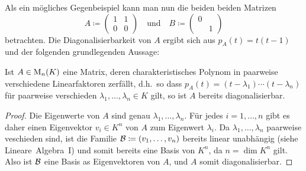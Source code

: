 Als ein mögliches Gegenbeispiel kann man nun die beiden beiden Matrizen
\[
            A
  \coloneqq \begin{pmatrix}
              1 & 1
              \\
              0 & 0
            \end{pmatrix}
  \quad\text{und}\quad
            B
  \coloneqq \begin{pmatrix}
              0 & 
              \\
                & 1
            \end{pmatrix}
\]
betrachten.
Die Diagonalisierbarkeit von $A$ ergibt sich aus $p_A(t) = t(t-1)$ und der folgenden grundlegenden Aussage:

\begin{lemma}
  \label{lemma: matrices with pairwise different eigenvalues are diagonalizable}
  Ist $A \in \operatorname{M}_{n}(K)$ eine Matrix, deren charakteristisches Polynom in paarweise verschiedene Linearfaktoren zerfällt, d.h.\ so dass $p_A(t) = (t - \lambda_1) \dotsm (t - \lambda_n)$ für paarweise verschieden $\lambda_1, \dotsc, \lambda_n \in K$ gilt, so ist $A$ bereits diagonalisierbar.
\end{lemma}
\begin{proof}
  Die Eigenwerte von $A$ sind genau $\lambda_1, \dotsc, \lambda_n$.
  Für jedes $i = 1, \dotsc, n$ gibt es daher einen Eigenvektor $v_i \in K^n$ von $A$ zum Eigenwert $\lambda_i$.
  Da $\lambda_1, \dotsc, \lambda_n$ paarweise veschieden sind, ist die Familie $\mathcal{B} \coloneqq (v_1, \dotsc, v_n)$ bereits linear unabhängig (siehe Lineare~Algebra~I) und somit bereits eine Basis von $K^n$, da $n = \dim K^n$ gilt.
  Also ist $\mathcal{B}$ eine Basis as Eigenvektoren von $A$, und $A$ somit diagonalisierbar.
\end{proof}

